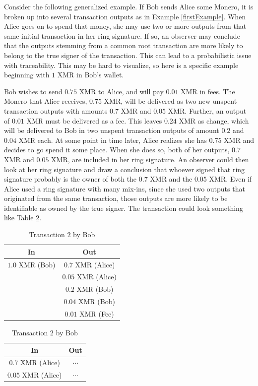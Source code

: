 \documentclass[12pt,english]{mrl}
\theoremstyle{definition}
\numberwithin{equation}{section}
\numberwithin{figure}{section}
\numberwithin{equation}{section}
\numberwithin{equation}{section}
\numberwithin{figure}{section}
\begin{document}
Consider the following generalized example. If Bob sends Alice some Monero, it is broken up into several transaction outputs as in Example \ref{firstExample}. When Alice goes on to spend that money, she may use two or more outputs from that same initial transaction in her ring signature. If so, an observer may conclude that the outputs stemming from a common root transaction are more likely to belong to the true signer of the transaction. This can lead to a probabilistic issue with traceability. This may be hard to visualize, so here is a specific example beginning with $1$ XMR in Bob's wallet. 

Bob wishes to send $0.75$ XMR to Alice, and will pay $0.01$ XMR in fees. The Monero that Alice receives, $0.75$ XMR, will be delivered as two new unspent transaction outputs with amounts $0.7$ XMR and $0.05$ XMR. Further, an output of $0.01$ XMR must be delivered as a fee. This leaves $0.24$ XMR as change, which will be delivered to Bob in two unspent transaction outputs of amount $0.2$ and $0.04$ XMR each. At some point in time later, Alice realizes she has $0.75$ XMR and decides to go spend it some place. When she does so, both of her outputs, $0.7$ XMR and $0.05$ XMR, are included in her ring signature. An observer could then look at her ring signature and draw a conclusion that whoever signed that ring signature probably is the owner of both the $0.7$ XMR and the $0.05$ XMR. Even if Alice used a ring signature with many mix-ins, since she used two outputs that originated from the same transaction, those outputs are more likely to be identifiable as owned by the true signer. The transaction could look something like Table \ref{linkByAssociation}.

\begin{table}[!htb]
    \caption{Linking transaction outputs by association}
    \label{linkByAssociation}
    \begin{subtable}{.5\linewidth}
      \centering
        \caption{Transaction $1$ by Bob}
        \begin{tabular}{|c|c|}\hline
            In & Out \\\hline
            $1.0$ XMR (Bob) & $0.7$ XMR (Alice)\\
             & $0.05$ XMR (Alice)\\
             & $0.2$ XMR (Bob)\\
             & $0.04$ XMR (Bob)\\
             & $0.01$ XMR (Fee)\\\hline
        \end{tabular}
    \end{subtable}%
    \begin{subtable}{.5\linewidth}
      \centering
        \caption{Transaction $2$ by Bob}
        \begin{tabular}{|c|c|}\hline
            In & Out \\\hline
            $0.7$ XMR (Alice) & $\cdots$ \\
            $0.05$ XMR (Alice) & $\cdots$ \\\hline
        \end{tabular}
    \end{subtable}%
\end{table}
 
\end{document}
